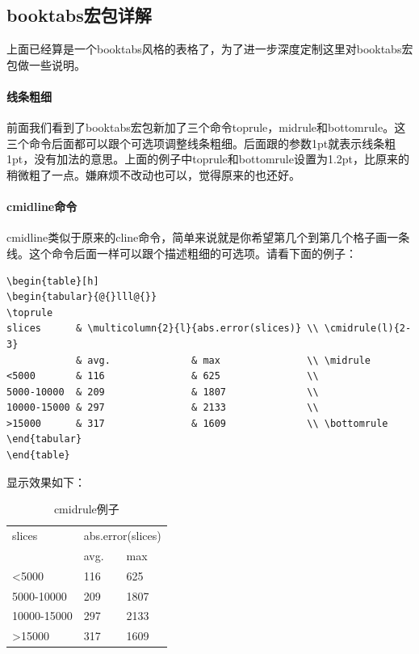 \documentclass[11pt,oneside]{book}
\begin{document}
\begin{common-format}
\subsection{booktabs宏包详解}
上面已经算是一个booktabs风格的表格了，为了进一步深度定制这里对booktabs宏包做一些说明。

\paragraph{线条粗细}
前面我们看到了booktabs宏包新加了三个命令toprule，midrule和bottomrule。这三个命令后面都可以跟个可选项调整线条粗细。后面跟的参数1pt就表示线条粗1pt，没有加法的意思。上面的例子中toprule和bottomrule设置为1.2pt，比原来的稍微粗了一点。嫌麻烦不改动也可以，觉得原来的也还好。

\paragraph{cmidline命令}
cmidline类似于原来的cline命令，简单来说就是你希望第几个到第几个格子画一条线。这个命令后面一样可以跟个描述粗细的可选项。请看下面的例子：

\begin{Verbatim}
\begin{table}[h]
\begin{tabular}{@{}lll@{}}
\toprule
slices      & \multicolumn{2}{l}{abs.error(slices)} \\ \cmidrule(l){2-3} 
            & avg.              & max               \\ \midrule
<5000       & 116               & 625               \\
5000-10000  & 209               & 1807              \\
10000-15000 & 297               & 2133              \\
>15000      & 317               & 1609              \\ \bottomrule
\end{tabular}
\end{table}
\end{Verbatim}

显示效果如下：
\begin{table}[H]
\begin{tabular}{@{}lll@{}}
\toprule
slices      & \multicolumn{2}{l}{abs.error(slices)} \\ \cmidrule(l){2-3} 
            & avg.              & max               \\ \midrule
<5000       & 116               & 625               \\
5000-10000  & 209               & 1807              \\
10000-15000 & 297               & 2133              \\
>15000      & 317               & 1609              \\ \bottomrule
\end{tabular}
\caption{cmidrule例子}
\label{tab:cmidrule例子}
\end{table}


\end{common-format}
\end{document}
